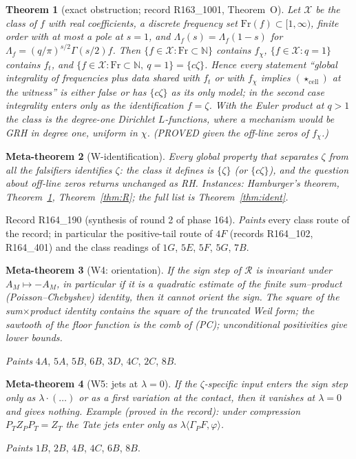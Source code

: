 \documentclass[11pt]{amsart}
\newtheorem{theorem}{Theorem}[section]
\newtheorem{metatheorem}[theorem]{Meta-theorem}
\theoremstyle{definition}
\theoremstyle{remark}
\newcommand{\N}{\mathbb N}
\begin{document}
\begin{theorem}[exact obstruction; record R163\_1001, Theorem~O]\label{thm:O}
Let $\mathcal X$ be the class of $f$ with real coefficients, a discrete frequency set $\mathrm{Fr}(f)\subset[1,\infty)$,
finite order with at most a pole at $s=1$, and $\Lambda_f(s)=\Lambda_f(1-s)$ for $\Lambda_f=(q/\pi)^{s/2}\Gamma(s/2)f$.
Then $\{f\in\mathcal X:\mathrm{Fr}\subset\N\}$ contains $f_\chi$, $\{f\in\mathcal X:q=1\}$ contains $f_t$, and
$\{f\in\mathcal X:\mathrm{Fr}\subset\N,\ q=1\}=\{c\zeta\}$. Hence every statement ``global integrality of frequencies
plus data shared with $f_t$ or with $f_\chi$ implies $(\star_{\mathrm{cell}})$ at the witness'' is either false or has
$\{c\zeta\}$ as its only model; in the second case integrality enters only as the identification $f=\zeta$. With the
Euler product at $q>1$ the class is the degree-one Dirichlet $L$-functions, where a mechanism would be GRH in degree
one, uniform in $\chi$. (PROVED given the off-line zeros of $f_\chi$.)
\end{theorem}

\begin{metatheorem}[W-identification]\label{Wident}
Every global property that separates $\zeta$ from all the falsifiers identifies $\zeta$: the class it defines is $\{\zeta\}$
(or $\{c\zeta\}$), and the question about off-line zeros returns unchanged as RH. Instances: Hamburger's theorem, Theorem~\ref{thm:O},
Theorem~\ref{thm:R}; the full list is Theorem~\ref{thm:ident}.
\end{metatheorem}
\noindent Record R164\_190 (synthesis of round 2 of phase 164). \emph{Paints} every class route of the record; in particular the
positive-tail route of $4F$ (records R164\_102, R164\_401) and the class readings of $1G$, $5E$, $5F$, $5G$, $7B$.

\begin{metatheorem}[W4: orientation]\label{W4}
If the sign step of $\mathcal R$ is invariant under $A_M\mapsto-A_M$, in particular if it is a quadratic
estimate of the finite sum--product (Poisson--Chebyshev) identity, then it cannot orient the sign. The
square of the sum$\times$product identity contains the square of the truncated Weil form; the sawtooth of
the floor function is the comb of (PC); unconditional positivities give lower bounds.
\end{metatheorem}
\noindent \emph{Paints} $4A$, $5A$, $5B$, $6B$, $3D$, $4C$, $2C$, $8B$.

\begin{metatheorem}[W5: jets at $\lambda=0$]\label{W5}
If the $\zeta$-specific input enters the sign step only as $\lambda\cdot(\dots)$ or as a first variation at
the contact, then it vanishes at $\lambda=0$ and gives nothing. Example (proved in the record): under
compression $P_TZ_PP_T=Z_T$ the Tate jets enter only as $\lambda\langle\Gamma_PF,\varphi\rangle$.
\end{metatheorem}
\noindent \emph{Paints} $1B$, $2B$, $4B$, $4C$, $6B$, $8B$.
\end{document}
